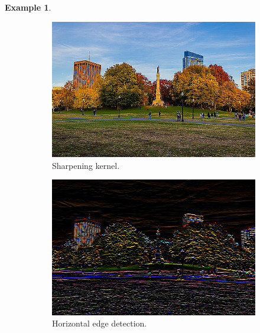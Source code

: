 \documentclass{article}
\theoremstyle{definition}
\newtheorem{example}{Example}[section]
\theoremstyle{remark}
\theoremstyle{definition}
\begin{document}
\begin{example}
\begin{figure}[hbt!]
        \begin{subfigure}[b]{0.32\textwidth}
        \centering
            \includegraphics[width=\textwidth]{Images/OpenCV/Sharpen.png}
            \caption{Sharpening kernel. } \label{fig:sharpened_image}
        \end{subfigure} 
        \begin{subfigure}[b]{0.32\textwidth}
        \centering
            \includegraphics[width=\textwidth]{Images/OpenCV/Horizontal.png}
            \caption{Horizontal edge detection. }
            \label{fig:horizontal_edge}
        \end{subfigure}
        \begin{subfigure}[b]{0.32\textwidth}
        \centering

\end{subfigure}
\end{figure}
\end{example}
\end{document}
